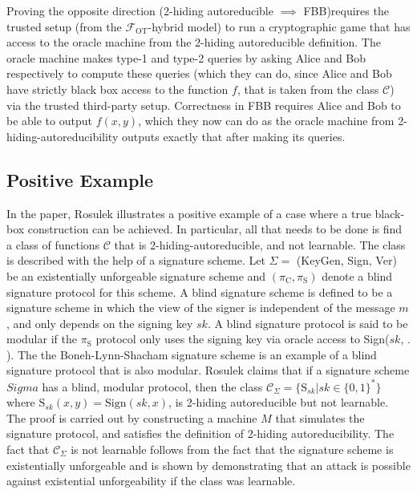 \documentclass[11pt]{article}
\theoremstyle{theorem}
\theoremstyle{theorem}
\theoremstyle{remark}
\theoremstyle{note}
\theoremstyle{plain}
\theoremstyle{definition}
\begin{document}
Proving the opposite direction (2-hiding autoreducible $\implies$ FBB)requires the trusted setup (from the $\mathcal{F}_\text{OT}$-hybrid model) to run a cryptographic game that has access to the oracle machine from the 2-hiding autoreducible definition. The oracle machine makes type-1 and type-2 queries by asking Alice and Bob respectively to compute these queries (which they can do, since Alice and Bob have strictly black box access to the function $f$, that is taken from the class $\mathcal{C}$) via the trusted third-party setup. Correctness in FBB requires Alice and Bob to be able to output $f(x,y)$, which they now can do as the oracle machine from 2-hiding-autoreducibility outputs exactly that after making its queries.

\subsection{Positive Example}
In the paper, Rosulek illustrates a positive example of a case where a true black-box construction can be achieved. In particular, all that needs to be done is find a class of functions $\mathcal{C}$ that is 2-hiding-autoreducible, and not learnable. The class is described with the help of a signature scheme. Let $\Sigma = $ (KeyGen, Sign, Ver) be an existentially unforgeable signature scheme and $(\pi_\text{C}, \pi_\text{S})$ denote a blind signature protocol for this scheme. A blind signature scheme is defined to be a signature scheme in which the view of the signer is independent of the message $m$, and only depends on the signing key $sk$. A blind signature protocol is said to be modular if the $\pi_\text{S}$ protocol only uses the signing key via oracle access to Sign($sk$, $.$ ). The the Boneh-Lynn-Shacham signature scheme \cite{JC:BonLynSha04} is an example of a blind signature protocol that is also modular. Rosulek claims that if a signature scheme $Sigma$ has a blind, modular protocol, then the class $\mathcal{C}_\Sigma = \{ \text{S}_{sk} | sk \in \{0, 1\}^* \}$ where $\text{S}_{sk} (x, y) = \text{Sign} (sk, x)$, is 2-hiding autoreducible but not learnable. The proof is carried out by constructing a machine $M$ that simulates the signature protocol, and satisfies the definition of 2-hiding autoreducibility. The fact that $\mathcal{C}_\Sigma$ is not learnable follows from the fact that the signature scheme is existentially unforgeable and is shown by demonstrating that an attack is possible against existential unforgeability if the class was learnable.
\end{document}
